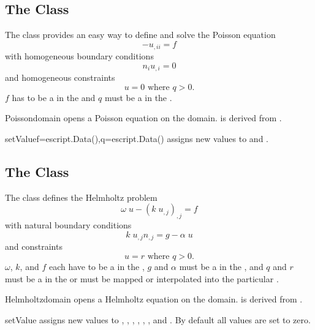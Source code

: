 \subsection{The \Poisson Class}
The \Poisson class provides an easy way to define and solve the Poisson
equation
\begin{equation}\label{POISSON.1}
-u_{,ii}=f
\end{equation}
with homogeneous boundary conditions
\begin{equation}\label{POISSON.2}
n_{i}u_{,i}=0
\end{equation}
and homogeneous constraints
\begin{equation}\label{POISSON.3}
u=0 \mbox{ where } q>0 .
\end{equation}
$f$ has to be a \Scalar in the \Function and $q$ must be a \Scalar in the \SolutionFS.

\begin{classdesc}{Poisson}{domain}
opens a Poisson equation on the \Domain domain. \Poisson is derived from \LinearPDE.
\end{classdesc}
\begin{methoddesc}[Poisson]{setValue}{f=escript.Data(),q=escript.Data()}
assigns new values to  and .
\end{methoddesc}

\subsection{The \Helmholtz Class}
The \Helmholtz class defines the Helmholtz problem
\begin{equation}\label{HZ.1}
\omega \; u - (k\; u_{,j})_{,j} = f
\end{equation}
with natural boundary conditions
\begin{equation}\label{HZ.2}
k\; u_{,j} n_{,j} = g- \alpha \; u
\end{equation}
and constraints
\begin{equation}\label{HZ.3}
u=r \mbox{ where } q>0 .
\end{equation}
$\omega$, $k$, and $f$ each have to be a \Scalar in the \Function, $g$ and
$\alpha$ must be a \Scalar in the \FunctionOnBoundary, and $q$ and $r$ must be
a \Scalar in the \SolutionFS or must be mapped or interpolated into the
particular \FunctionSpace.

\begin{classdesc}{Helmholtz}{domain}
opens a Helmholtz equation on the \Domain domain. \Helmholtz is derived from \LinearPDE.
\end{classdesc}
\begin{methoddesc}[Helmholtz]{setValue}{       }
assigns new values to , , , , ,
, and . By default all values are set to zero.
\end{methoddesc}

